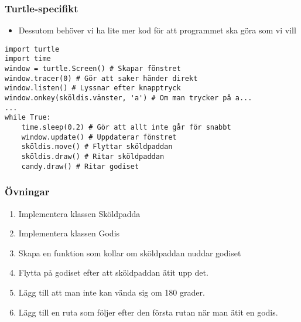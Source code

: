\documentclass[aspectratio=169]{beamer}
\begin{document}
\begin{frame}[fragile]
	\frametitle{Turtle-specifikt}
	
	\begin{itemize}
		\item Dessutom behöver vi ha lite mer kod för att programmet ska göra som vi vill
	\end{itemize}
	
	\begin{lstlisting}
import turtle
import time
window = turtle.Screen() # Skapar fönstret
window.tracer(0) # Gör att saker händer direkt
window.listen() # Lyssnar efter knapptryck
window.onkey(sköldis.vänster, 'a') # Om man trycker på a...
...
while True:
    time.sleep(0.2) # Gör att allt inte går för snabbt
    window.update() # Uppdaterar fönstret
    sköldis.move() # Flyttar sköldpaddan
    sköldis.draw() # Ritar sköldpaddan
    candy.draw() # Ritar godiset
	\end{lstlisting}
	
\end{frame}

\begin{frame}
	\frametitle{Övningar}
	
	\begin{enumerate}
		\item Implementera klassen Sköldpadda
		\item Implementera klassen Godis
		\item Skapa en funktion som kollar om sköldpaddan nuddar godiset
		\item Flytta på godiset efter att sköldpaddan ätit upp det.
		\item Lägg till att man inte kan vända sig om 180 grader.
		\item Lägg till en ruta som följer efter den första rutan när man ätit en godis.
	\end{enumerate}
	
\end{frame}
\end{document}

